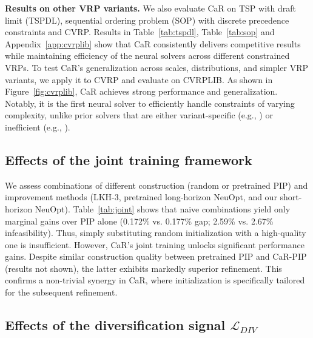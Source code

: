 \documentclass{article} %
\begin{document}
\begin{figure}[t]
\centering
    \begin{minipage}[t]{0.36\textwidth}
        
        \vspace{2.8pt} 
        
    \end{minipage}
    \hfill 
    \begin{minipage}[t]{0.63\textwidth}
        
    \end{minipage}
\end{figure}

\textbf{Results on other VRP variants.} {We also evaluate CaR on {TSP with draft limit (TSPDL), sequential ordering problem (SOP) with discrete precedence constraints} and CVRP. Results in Table~\ref{tab:tspdl}, Table~\ref{tab:sop} and Appendix~\ref{app:cvrplib} show that CaR consistently delivers competitive results while maintaining efficiency of the neural solvers across different constrained VRPs.}
To test CaR’s generalization across scales, distributions, and simpler VRP variants, we apply it to CVRP and evaluate on CVRPLIB. As shown in Figure~\ref{fig:cvrplib}, CaR achieves strong performance and generalization. Notably, it is the first neural solver to efficiently handle constraints of varying complexity, unlike prior solvers that are either variant-specific (e.g., \citet{bi2024learning}) or inefficient (e.g., \citet{ma2023learning}). 


\subsection{Effects of the joint training framework} 

{We assess combinations of different construction (random or pretrained PIP) and improvement methods (LKH-3, pretrained long-horizon NeuOpt, and our short-horizon NeuOpt). Table~\ref{tab:joint} shows that naive combinations yield only marginal gains over PIP alone (0.172\% vs. 0.177\% gap; 2.59\% vs. 2.67\% infeasibility). Thus, simply substituting random initialization with a high-quality one is insufficient. However, CaR's joint training unlocks significant performance gains. Despite similar construction quality between pretrained PIP and CaR-PIP (results not shown), the latter exhibits markedly superior refinement. This confirms a non-trivial synergy in CaR, where initialization is specifically tailored for the subsequent refinement.}

\subsection{{Effects of the diversification signal \texorpdfstring{$\mathcal{L}_{DIV}$}{L\_DIV}}}
\end{document}
